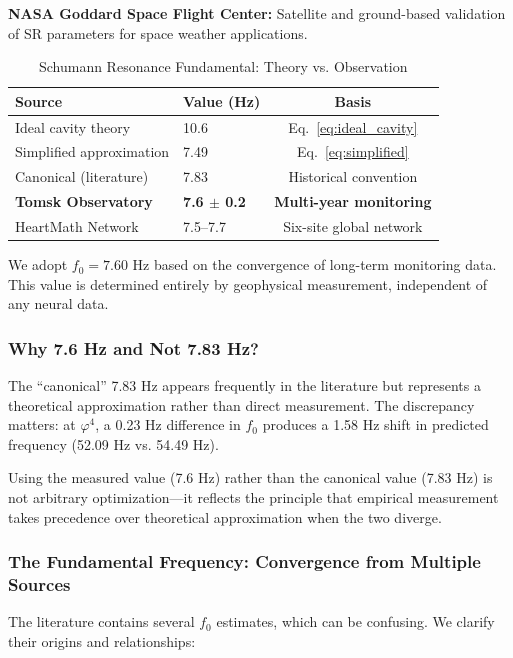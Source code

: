 \documentclass[11pt,a4paper]{article}
\newcommand{\phisym}{\varphi}
\newcommand{\fzero}{f_0}
\begin{document}
\textbf{NASA Goddard Space Flight Center:} Satellite and ground-based validation of SR parameters for space weather applications.

\begin{table}[H]
\centering
\caption{Schumann Resonance Fundamental: Theory vs. Observation}
\label{tab:sr_values}
\begin{tabular}{@{}llc@{}}
\toprule
Source & Value (Hz) & Basis \\
\midrule
Ideal cavity theory & 10.6 & Eq.~\ref{eq:ideal_cavity} \\
Simplified approximation & 7.49 & Eq.~\ref{eq:simplified} \\
Canonical (literature) & 7.83 & Historical convention \\
\textbf{Tomsk Observatory} & \textbf{7.6 $\pm$ 0.2} & \textbf{Multi-year monitoring} \\
HeartMath Network & 7.5--7.7 & Six-site global network \\
\bottomrule
\end{tabular}
\end{table}

We adopt $\fzero = 7.60$ Hz based on the convergence of long-term monitoring data. This value is determined entirely by geophysical measurement, independent of any neural data.

\subsubsection{Why 7.6 Hz and Not 7.83 Hz?}

The ``canonical'' 7.83 Hz appears frequently in the literature but represents a theoretical approximation rather than direct measurement. The discrepancy matters: at $\phisym^4$, a 0.23 Hz difference in $\fzero$ produces a 1.58 Hz shift in predicted frequency (52.09 Hz vs. 54.49 Hz).

Using the measured value (7.6 Hz) rather than the canonical value (7.83 Hz) is not arbitrary optimization---it reflects the principle that empirical measurement takes precedence over theoretical approximation when the two diverge.

\subsubsection{The Fundamental Frequency: Convergence from Multiple Sources}

The literature contains several $\fzero$ estimates, which can be confusing. We clarify their origins and relationships:
\end{document}
